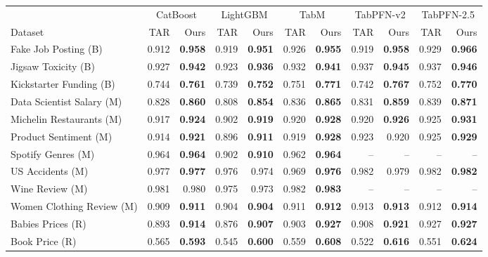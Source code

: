 \begin{tabular}{lrrrrrrrrrr}
\toprule
& \multicolumn{2}{c}{CatBoost} & \multicolumn{2}{c}{LightGBM} & \multicolumn{2}{c}{TabM} & \multicolumn{2}{c}{TabPFN-v2} & \multicolumn{2}{c}{TabPFN-2.5} \\
\cmidrule(lr){2-3}\cmidrule(lr){4-5}\cmidrule(lr){6-7}\cmidrule(lr){8-9}\cmidrule(lr){10-11}
Dataset & TAR & Ours & TAR & Ours & TAR & Ours & TAR & Ours & TAR & Ours \\
\midrule
Fake Job Posting (B) & 0.912 & \textbf{0.958} & 0.919 & \textbf{0.951} & 0.926 & \textbf{0.955} & 0.919 & \textbf{0.958} & 0.929 & \textbf{0.966} \\
Jigsaw Toxicity (B) & 0.927 & \textbf{0.942} & 0.923 & \textbf{0.936} & 0.932 & \textbf{0.941} & 0.937 & \textbf{0.945} & 0.937 & \textbf{0.946} \\
Kickstarter Funding (B) & 0.744 & \textbf{0.761} & 0.739 & \textbf{0.752} & 0.751 & \textbf{0.771} & 0.742 & \textbf{0.767} & 0.752 & \textbf{0.770} \\
Data Scientist Salary (M) & 0.828 & \textbf{0.860} & 0.808 & \textbf{0.854} & 0.836 & \textbf{0.865} & 0.831 & \textbf{0.859} & 0.839 & \textbf{0.871} \\
Michelin Restaurants (M) & 0.917 & \textbf{0.924} & 0.902 & \textbf{0.919} & 0.920 & \textbf{0.928} & 0.920 & \textbf{0.926} & 0.925 & \textbf{0.931} \\
Product Sentiment (M) & 0.914 & \textbf{0.921} & 0.896 & \textbf{0.911} & 0.919 & \textbf{0.928} & 0.923 & 0.920 & 0.925 & \textbf{0.929} \\
Spotify Genres (M) & 0.964 & \textbf{0.964} & 0.902 & \textbf{0.910} & 0.962 & \textbf{0.964} & -- & -- & -- & -- \\
US Accidents (M) & 0.977 & \textbf{0.977} & 0.976 & 0.974 & 0.969 & \textbf{0.976} & 0.982 & 0.979 & 0.982 & \textbf{0.982} \\
Wine Review (M) & 0.981 & 0.980 & 0.975 & 0.973 & 0.982 & \textbf{0.983} & -- & -- & -- & -- \\
Women Clothing Review (M) & 0.909 & \textbf{0.911} & 0.904 & \textbf{0.904} & 0.911 & \textbf{0.912} & 0.913 & \textbf{0.913} & 0.912 & \textbf{0.914} \\
Babies Prices (R) & 0.893 & \textbf{0.914} & 0.876 & \textbf{0.907} & 0.903 & \textbf{0.927} & 0.908 & \textbf{0.921} & 0.927 & \textbf{0.927} \\
Book Price (R) & 0.565 & \textbf{0.593} & 0.545 & \textbf{0.600} & 0.559 & \textbf{0.608} & 0.522 & \textbf{0.616} & 0.551 & \textbf{0.624} \\

\end{tabular}
